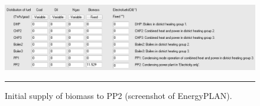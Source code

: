 \begin{figure}[htbp]
	\centering
	\includegraphics[width=\textwidth]{figures/B01_BM.png}
	\rule{\textwidth}{0.5pt} %
	\caption{Initial supply of biomass to PP2 (screenshot of EnergyPLAN).}
	\label{fig:B01-BM}
\end{figure}